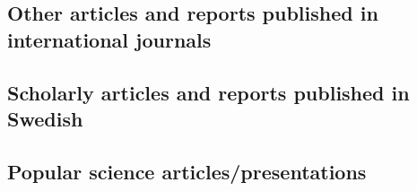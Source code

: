 \subsection{Other articles and reports published in international journals \noneyet}\label{ssec:other-articles-and-reports-published-in-international-journals-noneyet}

\subsection{Scholarly articles and reports published in Swedish \noneyet}\label{ssec:scholarly-articles-and-reports-published-in-swedish-noneyet}

\subsection{Popular science articles/presentations}\label{ssec:popular-science-articles-presentations}

